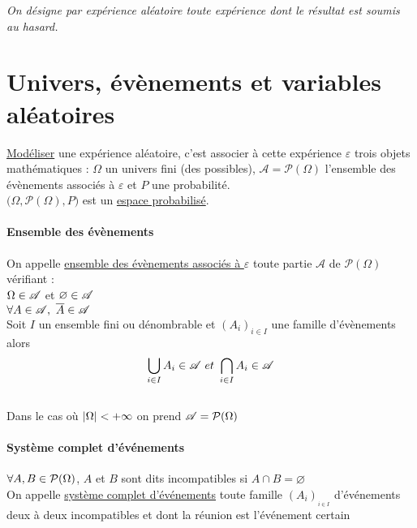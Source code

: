 

\textsl{On désigne par expérience aléatoire toute expérience dont le résultat est soumis au hasard.}
\minitoc
	\section{Univers, évènements et variables aléatoires}
		\uline{Modéliser} une expérience aléatoire, c'est associer à cette expérience $\varepsilon$ trois objets mathématiques : $\Omega$ un univers fini (des possibles), $\mathscr{A} = \mathcal{P}(\Omega)$ l'ensemble des évènements associés à $\varepsilon$ et $P$ une probabilité.\\ \hspace*{0.5cm}
		$\big(\Omega ,\mathcal{P}(\Omega),P\big)$ est un \uline{espace probabilisé}.
		\traitd
		\paragraph{Ensemble des évènements}
			On appelle \uline{ensemble des évènements associés à $\varepsilon$} toute partie $\mathscr{A}$ de $\mathcal{P}(\Omega)$ vérifiant :\\
			\hspace*{2cm} \un $\Omega\in {\mathscr{A}}$ et $\varnothing\in{\mathscr{A}}$\\
			\hspace*{2cm} \deux $\forall A\in{\mathscr{A}} ,~ \overline{A}\in{\mathscr{A}}$\\
			\hspace*{2cm} \trois Soit $I$ un ensemble fini ou dénombrable et $(A_i)_{i\in I}$ une famille d'évènements alors 
			\[ \bigcup_{i\in I} A_i \in {\mathscr{A}} ~et~ \bigcap_{i\in I} A_i \in {\mathscr{A}} \]
			\trait \vspace*{-1.2cm} \\
			Dans le cas où $\left\vert \Omega \right\vert < +\infty$ on prend ${\mathscr{A}} =\mathcal{P}(\Omega)$ \\ \traitd
		\paragraph{Système complet d'événements}
			${}$ \\ \hspace*{2cm} \un $\forall A,B\in {\mathcal{P}}(\Omega)$, $A$ et $B$ sont dits incompatibles si $A\cap B = \varnothing$ \\
			\hspace*{2cm} \deux On appelle \uline{système complet d'événements} toute famille $(A_i)_{_{i\in I}}$ d'événements deux à deux incompatibles et dont la réunion est l'événement certain \trait ${}$ \vspace*{-1.3cm} \traitd
